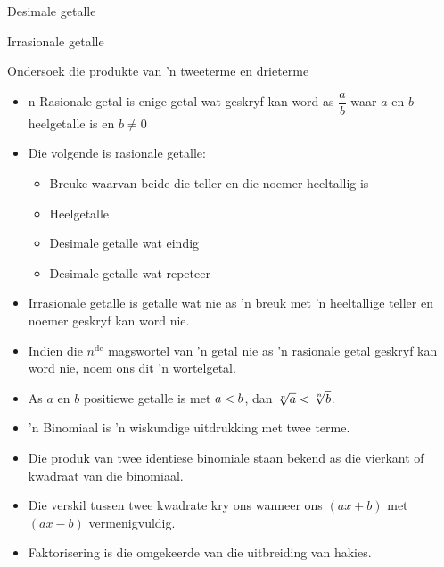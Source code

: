\begin{Aktiwiteit}{Desimale getalle}
\begin{aktiwiteit}{Irrasionale getalle}
\begin{aktiwiteit}{Ondersoek die produkte van 'n tweeterme en drieterme}
\begin{itemize}[itemsep=5pt, label=\textbullet{}]
\item n Rasionale getal is enige getal wat geskryf kan word as $\dfrac{a}{b}$
waar $a$ en $b$ heelgetalle is en $b\ne 0$\item Die volgende is rasionale getalle:
    \begin{itemize}[noitemsep]
	\item Breuke waarvan beide die teller en die noemer heeltallig is
	\item Heelgetalle
	\item Desimale getalle wat eindig
	\item Desimale getalle wat repeteer
    \end{itemize}
\item Irrasionale getalle is getalle wat nie as ’n breuk met ’n heeltallige teller en noemer geskryf kan word nie.
\item Indien die ${n}^{\mathrm{de}}$ magswortel van ’n getal nie as ’n rasionale getal geskryf kan word nie, noem ons dit ’n wortelgetal.
\item As $a$ en $b$ positiewe getalle is met $a<{}b$, dan $\sqrt[n]{a}<{}\sqrt[n]{b}$.
\item ’n Binomiaal is ’n wiskundige uitdrukking met twee terme.
\item Die produk van twee identiese binomiale staan bekend as die vierkant of kwadraat van die binomiaal. 
\item Die verskil tussen twee kwadrate kry ons wanneer ons $(ax+b)$ met $(ax-b)$ vermenigvuldig.
\item Faktorisering is die omgekeerde van die uitbreiding van hakies.

\end{itemize}
\end{aktiwiteit}
\end{aktiwiteit}
\end{Aktiwiteit}
